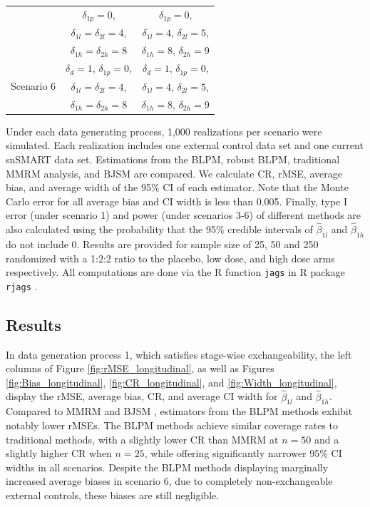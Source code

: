 \begin{table}
\begin{center}
\begin{tabular}{ccc}
& $\delta_{1p} = 0$, & $\delta_{1p} = 0$,\\
 & $\delta_{1l} = \delta_{2l} = 4$, & $\delta_{1l} = 4$, $\delta_{2l} = 5$, \\
 & $\delta_{1h} = \delta_{2h} = 8$ & $\delta_{1h} = 8$, $\delta_{2h} = 9$\\ 
\hline
\multirow{3}{4.5em}{Scenario 6} & $\delta_d = 1$, $\delta_{1p} = 0$, & $\delta_d = 1$, $\delta_{1p} = 0$,\\
 & $\delta_{1l} = \delta_{2l} = 4$, & $\delta_{1l} = 4$, $\delta_{2l} = 5$, \\
 & $\delta_{1h} = \delta_{2h} = 8$ & $\delta_{1h} = 8$, $\delta_{2h} = 9$\\ 
\hline
\end{tabular}
\end{center}
\end{table}

Under each data generating process, 1,000 realizations per scenario were simulated. Each realization includes one external control data set and one current \ac{snSMART} data set. Estimations from the \ac{BLPM}, robust \ac{BLPM}, traditional \ac{MMRM} analysis, and \ac{BJSM} are compared. We calculate \ac{CR}, \ac{rMSE}, average bias, and average width of the 95\% \ac{CI} of each estimator. Note that the Monte Carlo error for all average bias and \ac{CI} width is less than 0.005. Finally, type I error (under scenario 1) and power (under scenarios 3-6) of different methods are also calculated using the probability that the 95\% credible intervals of $\hat{\beta}_{1l}$ and $\hat{\beta}_{1h}$ do not include 0. Results are provided for sample size of 25, 50 and 250 randomized with a 1:2:2 ratio to the placebo, low dose, and high dose arms respectively. All computations are done via the R function \texttt{jags} in R package \texttt{rjags} \citep{rjags}.

\subsection{Results}
In data generation process 1, which satisfies stage-wise exchangeability, the left columns of Figure \ref{fig:rMSE_longitudinal}, as well as Figures \ref{fig:Bias_longitudinal}, \ref{fig:CR_longitudinal}, and \ref{fig:Width_longitudinal}, display the \ac{rMSE}, average bias, \ac{CR}, and average \ac{CI} width for $\hat{\beta}_{1l}$ and $\hat{\beta}_{1h}$. Compared to \ac{MMRM} and \ac{BJSM} , estimators from the \ac{BLPM} methods exhibit notably lower rMSEs. The \ac{BLPM} methods achieve similar coverage rates to traditional methods, with a slightly lower \ac{CR} than \ac{MMRM} at $n = 50$ and a slightly higher \ac{CR} when $n = 25$, while offering significantly narrower 95\% \ac{CI} widths in all scenarios. Despite the \ac{BLPM} methods displaying marginally increased average biases in scenario 6, due to completely non-exchangeable external controls, these biases are still negligible.

